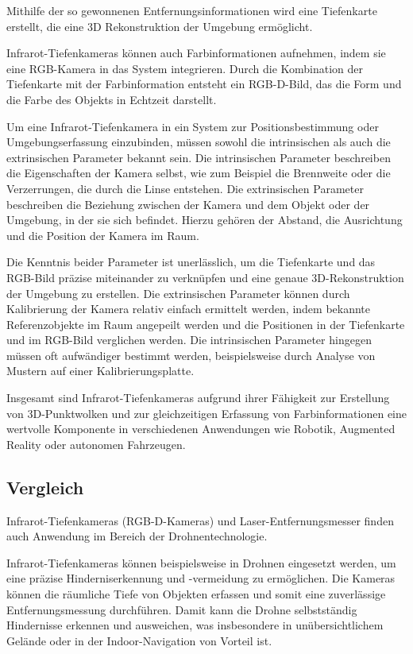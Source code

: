    Mithilfe der so gewonnenen Entfernungsinformationen wird eine Tiefenkarte erstellt, die eine 3D Rekonstruktion der Umgebung ermöglicht.

    
    
   Infrarot-Tiefenkameras können auch Farbinformationen aufnehmen, indem sie eine RGB-Kamera in das System integrieren. Durch die Kombination der Tiefenkarte mit der Farbinformation entsteht ein RGB-D-Bild, das die Form und die Farbe des Objekts in Echtzeit darstellt.

    Um eine Infrarot-Tiefenkamera in ein System zur Positionsbestimmung oder Umgebungserfassung einzubinden, müssen sowohl die intrinsischen als auch die extrinsischen Parameter bekannt sein. Die intrinsischen Parameter beschreiben die Eigenschaften der Kamera selbst, wie zum Beispiel die Brennweite oder die Verzerrungen, die durch die Linse entstehen. Die extrinsischen Parameter beschreiben die Beziehung zwischen der Kamera und dem Objekt oder der Umgebung, in der sie sich befindet. Hierzu gehören der Abstand, die Ausrichtung und die Position der Kamera im Raum.

    Die Kenntnis beider Parameter ist unerlässlich, um die Tiefenkarte und das RGB-Bild präzise miteinander zu verknüpfen und eine genaue 3D-Rekonstruktion der Umgebung zu erstellen. Die extrinsischen Parameter können durch Kalibrierung der Kamera relativ einfach ermittelt werden, indem bekannte Referenzobjekte im Raum angepeilt werden und die Positionen in der Tiefenkarte und im RGB-Bild verglichen werden. Die intrinsischen Parameter hingegen müssen oft aufwändiger bestimmt werden, beispielsweise durch Analyse von Mustern auf einer Kalibrierungsplatte.
    
    Insgesamt sind Infrarot-Tiefenkameras aufgrund ihrer Fähigkeit zur Erstellung von 3D-Punktwolken und zur gleichzeitigen Erfassung von Farbinformationen eine wertvolle Komponente in verschiedenen Anwendungen wie Robotik, Augmented Reality oder autonomen Fahrzeugen. 

    \cite[vgl.][Kapitel 3]{digital2030022}
    \cite[vgl.]{8310200}
\subsection{Vergleich}\label{chp:depth-sensor-compar}
    Infrarot-Tiefenkameras (\ac{RGB-D}-Kameras) und Laser-Entfernungsmesser finden auch Anwendung im Bereich der Drohnentechnologie.

Infrarot-Tiefenkameras können beispielsweise in Drohnen eingesetzt werden, um eine präzise Hinderniserkennung und -vermeidung zu ermöglichen. Die Kameras können die räumliche Tiefe von Objekten erfassen und somit eine zuverlässige Entfernungsmessung durchführen. Damit kann die Drohne selbstständig Hindernisse erkennen und ausweichen, was insbesondere in unübersichtlichem Gelände oder in der Indoor-Navigation von Vorteil ist.

